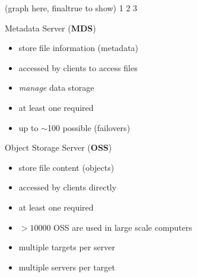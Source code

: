 \documentclass[compress,t,xcolor=dvipsnames]{beamer}
\begin{document}
\begin{frame}
{
    }
\else
    (graph here, finaltrue to show)
     {1}
     {2}
     {3}
\fi
\end{frame}

\begin{frame}{Metadata Server (\textbf{MDS})}
    \begin{itemize}
        \item store file information (metadata)
        \item accessed by clients to access files
        \item \emph{manage} data storage
        \item at least one required
        \item up to $\sim$100 possible (failovers)
    \end{itemize}
\end{frame}


\begin{frame}{Object Storage Server (\textbf{OSS})}
    \begin{itemize}
        \item store file content (objects)
        \item accessed by clients directly
        \item at least one required
        \item $>10000$ OSS are used in large scale computers
        \item multiple targets per server
        \item multiple servers per target
    \end{itemize}
\end{frame}

\end{document}
